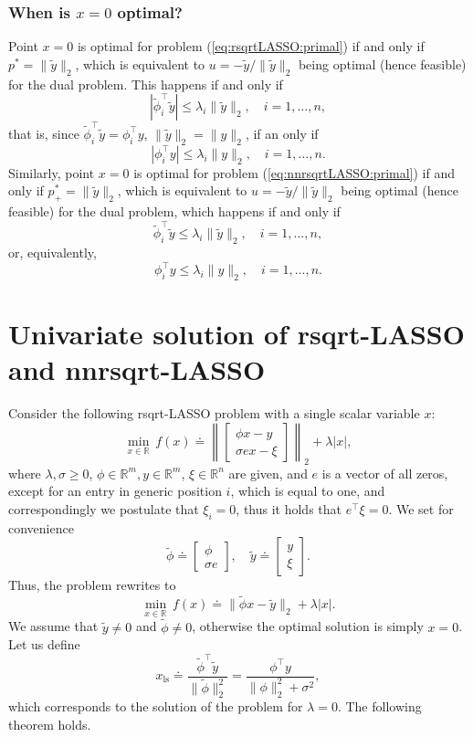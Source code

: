 \documentclass[11pt]{article}
\newcommand{\tran}{^{\top}}
\newcommand{\lam}{\lambda}
\newcommand{\beq}{\begin{equation}}
\newcommand{\eeq}{\end{equation}}
\newcommand{\ba}{\begin{array}}
\newcommand{\ea}{\end{array}}
\newcommand{\Real}[1]{ { {\mathbb R}^{#1} } }
\newcommand{\ped}[1]{{_{\mathrm{#1}}}}
\begin{document}
\subsubsection{When is $x=0$ optimal?}
Point  $x=0$ is optimal 
 for problem (\ref{eq:rsqrtLASSO:primal}) if and only if $p^* = \|\tilde y\|_2$, which is equivalent to $u = -\tilde y/\|\tilde y\|_2$  being optimal (hence feasible) for the dual problem. This happens if and only if
\[
|\tilde \phi_i\tran \tilde y| \leq \lam_i {\|\tilde y\|_2},\quad  i=1,\ldots,n,
\]
that is, since $\tilde \phi_i\tran \tilde y = \phi_i\tran y$, $\|\tilde y\|_2=\|y\|_2$, if an only if
\[
| \phi_i\tran  y| \leq \lam_i {\| y\|_2},\quad  i=1,\ldots,n.
\]
Similarly, point  $x=0$ is optimal 
 for problem (\ref{eq:nnrsqrtLASSO:primal}) if and only if $p^*_+ = \|\tilde y\|_2$, which is equivalent to $u = -\tilde y/\|\tilde y\|_2$ being optimal (hence feasible) for the dual problem, which happens if and only if
\[
\tilde \phi_i\tran \tilde y \leq \lam_i {\|\tilde y\|_2}, \quad  i=1,\ldots,n,
\]
or, equivalently,
\[
\phi_i\tran y \leq \lam_i {\| y\|_2}, \quad  i=1,\ldots,n.
\]


\section{Univariate solution of rsqrt-LASSO and  nnrsqrt-LASSO}
\label{sec:univ}

Consider the following  rsqrt-LASSO problem with a single scalar variable $x$:
\[
\min_{x\in\Real{}}\,  f(x)\doteq
\left\|\left[\ba{c}
\phi x - y \\
\sigma e x - \xi
\ea\right]\right\|_2 +  \lam |x|,
\]
where $\lam,\sigma\geq 0$,  $\phi\in\Real{m}, y\in\Real{m}$, $\xi\in\Real{n}$ are given, and $e$ is a vector of all zeros, except for an entry in generic position $i$, which is equal to one, and correspondingly we postulate that
$\xi_i=0$, thus it holds that $e\tran\xi=0$.
We set for convenience 
\beq
\tilde\phi \doteq  \left[\ba{c}
\phi \\ \sigma e
\ea\right], \quad \tilde y \doteq \left[\ba{c}
y \\ \xi
\ea\right].
\label{eq:tildephiy}
\eeq
Thus, the problem rewrites to
\beq
\min_{x\in\Real{}}\,  f(x)\doteq
\|
\tilde \phi x - \tilde y \|_2 +  \lam |x|.
\label{eq:univariate_sqrtLASSO}
\eeq
We  assume that $\tilde y \neq 0$ and
$\tilde \phi\neq 0$,
otherwise the optimal solution is simply $x=0$. Let us define
\[
x\ped{ls} \doteq 
\frac{\tilde\phi\tran \tilde y}{\|\tilde \phi\|_2^2} =
\frac{\phi\tran y}{\|\phi\|_2^2+\sigma^2},
\label{eq:xls}
\]
which corresponds to the solution of the problem for $\lam = 0$.
The following theorem holds.
\end{document}

